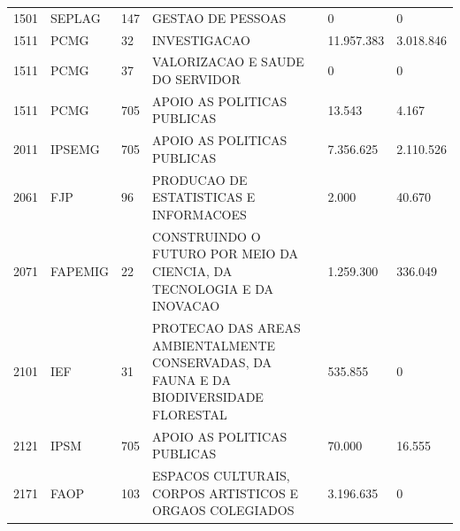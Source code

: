\documentclass{article}
\begin{document}
\begin{longtable}[c]{m{1cm}|m{1.5cm}|m{1cm}m{8cm}|m{2cm}m{2cm}}
\multicolumn{1}{C{1cm}|}{1501} & \multicolumn{1}{L{1.5cm}|}{SEPLAG} & \multicolumn{1}{C{1cm}|}{147} & \multicolumn{1}{L{8cm}|}{GESTAO DE PESSOAS} & \multicolumn{1}{R{2cm}|}{            0} & \multicolumn{1}{R{2cm}}{            0} \\
\multicolumn{1}{C{1cm}|}{1511} & \multicolumn{1}{L{1.5cm}|}{PCMG} & \multicolumn{1}{C{1cm}|}{32} & \multicolumn{1}{L{8cm}|}{INVESTIGACAO} & \multicolumn{1}{R{2cm}|}{11.957.383} & \multicolumn{1}{R{2cm}}{3.018.846} \\
\multicolumn{1}{C{1cm}|}{1511} & \multicolumn{1}{L{1.5cm}|}{PCMG} & \multicolumn{1}{C{1cm}|}{37} & \multicolumn{1}{L{8cm}|}{VALORIZACAO E SAUDE DO SERVIDOR} & \multicolumn{1}{R{2cm}|}{            0} & \multicolumn{1}{R{2cm}}{            0} \\
\multicolumn{1}{C{1cm}|}{1511} & \multicolumn{1}{L{1.5cm}|}{PCMG} & \multicolumn{1}{C{1cm}|}{705} & \multicolumn{1}{L{8cm}|}{APOIO AS POLITICAS PUBLICAS} & \multicolumn{1}{R{2cm}|}{13.543} & \multicolumn{1}{R{2cm}}{4.167} \\
\multicolumn{1}{C{1cm}|}{2011} & \multicolumn{1}{L{1.5cm}|}{IPSEMG} & \multicolumn{1}{C{1cm}|}{705} & \multicolumn{1}{L{8cm}|}{APOIO AS POLITICAS PUBLICAS} & \multicolumn{1}{R{2cm}|}{7.356.625} & \multicolumn{1}{R{2cm}}{2.110.526} \\
\multicolumn{1}{C{1cm}|}{2061} & \multicolumn{1}{L{1.5cm}|}{FJP} & \multicolumn{1}{C{1cm}|}{96} & \multicolumn{1}{L{8cm}|}{PRODUCAO DE ESTATISTICAS E INFORMACOES} & \multicolumn{1}{R{2cm}|}{2.000} & \multicolumn{1}{R{2cm}}{40.670} \\
\multicolumn{1}{C{1cm}|}{2071} & \multicolumn{1}{L{1.5cm}|}{FAPEMIG} & \multicolumn{1}{C{1cm}|}{22} & \multicolumn{1}{L{8cm}|}{CONSTRUINDO O FUTURO POR MEIO DA CIENCIA, DA TECNOLOGIA E DA INOVACAO} & \multicolumn{1}{R{2cm}|}{1.259.300} & \multicolumn{1}{R{2cm}}{336.049} \\
\multicolumn{1}{C{1cm}|}{2101} & \multicolumn{1}{L{1.5cm}|}{IEF} & \multicolumn{1}{C{1cm}|}{31} & \multicolumn{1}{L{8cm}|}{PROTECAO DAS AREAS AMBIENTALMENTE CONSERVADAS, DA FAUNA E DA BIODIVERSIDADE FLORESTAL} & \multicolumn{1}{R{2cm}|}{535.855} & \multicolumn{1}{R{2cm}}{            0} \\
\multicolumn{1}{C{1cm}|}{2121} & \multicolumn{1}{L{1.5cm}|}{IPSM} & \multicolumn{1}{C{1cm}|}{705} & \multicolumn{1}{L{8cm}|}{APOIO AS POLITICAS PUBLICAS} & \multicolumn{1}{R{2cm}|}{70.000} & \multicolumn{1}{R{2cm}}{16.555} \\
\multicolumn{1}{C{1cm}|}{2171} & \multicolumn{1}{L{1.5cm}|}{FAOP} & \multicolumn{1}{C{1cm}|}{103} & \multicolumn{1}{L{8cm}|}{ESPACOS CULTURAIS, CORPOS ARTISTICOS E ORGAOS COLEGIADOS} & \multicolumn{1}{R{2cm}|}{3.196.635} & \multicolumn{1}{R{2cm}}{            0} \\

\end{longtable}
\end{document}
